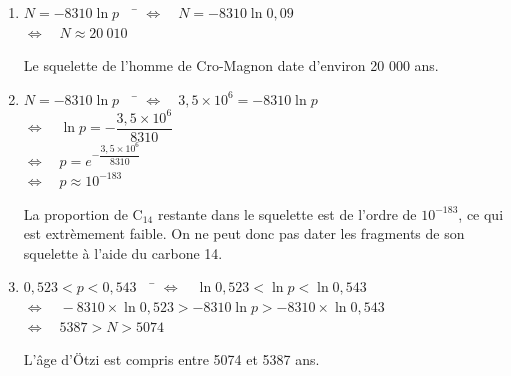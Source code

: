 \documentclass[a4paper,11pt,exos]{nsi} %
\begin{document}
\textcolor{UGLiBlue}{
    \begin{enumerate}
        \item \begin{tabbing}
            $N=-8310 \ln p\quad$ \= $\iff \quad N=-8310 \ln 0,09$\\
            \> $\iff \quad N\approx 20\ 010$
        \end{tabbing}
        Le squelette de l'homme de Cro-Magnon date d'environ 20 000 ans.
        \item \begin{tabbing}
            $N=-8310 \ln p\quad$ \= $\iff \quad 3,5 \times 10^6=-8310 \ln p$\\
            \> $\iff \quad \ln p= -\dfrac{3,5\times 10^6}{8310}$\\[.5em]
            \> $\iff \quad p=e^{-\dfrac{3,5\times 10^6}{8310}}$\\
            \> $\iff \quad p\approx 10^{-183}$
        \end{tabbing}
        La proportion de C$_{14}$ restante dans le squelette est de l'ordre de $10^{-183}$, ce qui est extrèmement faible. On ne peut donc pas dater les fragments de son squelette à l'aide du carbone 14.
        \item \begin{tabbing}
            $0,523<p<0,543 \quad$ \= $\iff \quad  \ln 0,523<\ln p<\ln 0,543$\\
            \> $\iff \quad -8310\times\ln 0,523>-8310 \ln p >-8310\times \ln 0,543$\\
            \> $\iff \quad 5387>N>5074$
        \end{tabbing}
        L'âge d'Ötzi est compris entre 5074 et 5387 ans.
    \end{enumerate}
}
\end{document}
